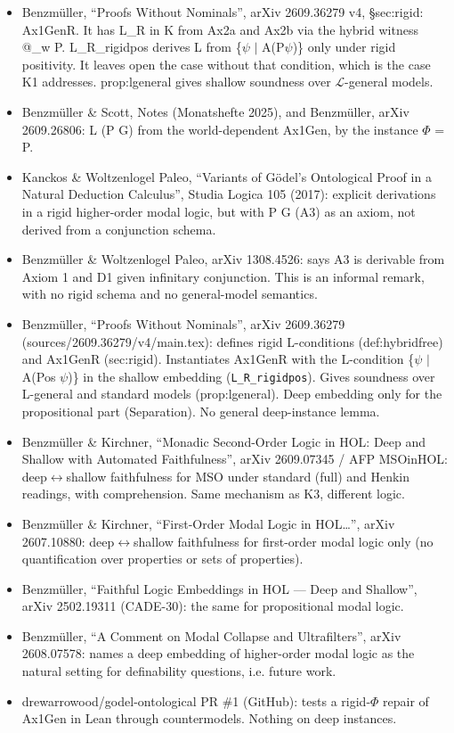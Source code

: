 \documentclass{article}
\begin{document}
\begin{itemize}
\item Benzmüller, ``Proofs Without Nominals'', arXiv 2609.36279 v4, \S{}sec:rigid: Ax1GenR. It has L\_R in K from Ax2a and Ax2b via the hybrid witness @\_w P. L\_R\_rigidpos derives L from \{$\psi$ $\mid$ A(P$\psi$)\} only under rigid positivity. It leaves open the case without that condition, which is the case K1 addresses. prop:lgeneral gives shallow soundness over $\mathcal{L}$-general models.
\item Benzmüller \& Scott, Notes (Monatshefte 2025), and Benzmüller, arXiv 2609.26806: L (P G) from the world-dependent Ax1Gen, by the instance $\Phi$ = P.
\item Kanckos \& Woltzenlogel Paleo, ``Variants of Gödel's Ontological Proof in a Natural Deduction Calculus'', Studia Logica 105 (2017): explicit derivations in a rigid higher-order modal logic, but with P G (A3) as an axiom, not derived from a conjunction schema.
\item Benzmüller \& Woltzenlogel Paleo, arXiv 1308.4526: says A3 is derivable from Axiom 1 and D1 given infinitary conjunction. This is an informal remark, with no rigid schema and no general-model semantics.
\item Benzmüller, ``Proofs Without Nominals'', arXiv 2609.36279 (sources/2609.36279/v4/main.tex): defines rigid L-conditions (def:hybridfree) and Ax1GenR (sec:rigid). Instantiates Ax1GenR with the L-condition \{$\psi$ $\mid$ A(Pos $\psi$)\} in the shallow embedding (\texttt{L\_R\_rigidpos}). Gives soundness over L-general and standard models (prop:lgeneral). Deep embedding only for the propositional part (Separation). No general deep-instance lemma.
\item Benzmüller \& Kirchner, ``Monadic Second-Order Logic in HOL: Deep and Shallow with Automated Faithfulness'', arXiv 2609.07345 / AFP MSOinHOL: deep$\leftrightarrow$shallow faithfulness for MSO under standard (full) and Henkin readings, with comprehension. Same mechanism as K3, different logic.
\item Benzmüller \& Kirchner, ``First-Order Modal Logic in HOL\ldots{}'', arXiv 2607.10880: deep$\leftrightarrow$shallow faithfulness for first-order modal logic only (no quantification over properties or sets of properties).
\item Benzmüller, ``Faithful Logic Embeddings in HOL --- Deep and Shallow'', arXiv 2502.19311 (CADE-30): the same for propositional modal logic.
\item Benzmüller, ``A Comment on Modal Collapse and Ultrafilters'', arXiv 2608.07578: names a deep embedding of higher-order modal logic as the natural setting for definability questions, i.e. future work.
\item drewarrowood/godel-ontological PR \#1 (GitHub): tests a rigid-$\Phi$ repair of Ax1Gen in Lean through countermodels. Nothing on deep instances.
\end{itemize}
\end{document}
